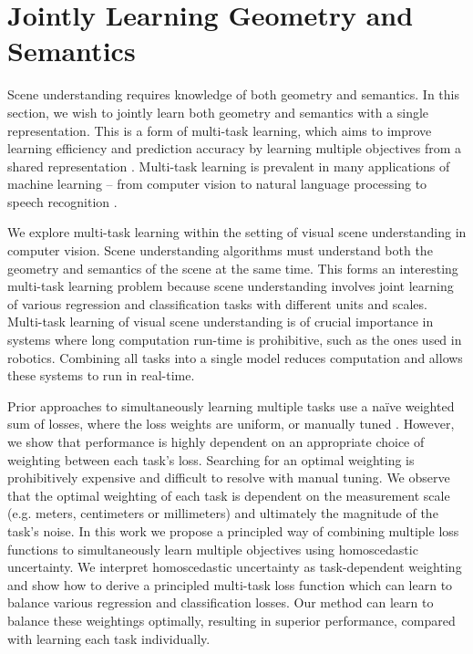\section{Jointly Learning Geometry and Semantics}
\label{sec:mlttask}

Scene understanding requires knowledge of both geometry and semantics. In this section, we wish to jointly learn both geometry and semantics with a single representation.
This is a form of multi-task learning, which aims to improve learning efficiency and prediction accuracy by learning multiple objectives from a shared representation \citep{caruana1998multitask}. Multi-task learning is prevalent in many applications of machine learning -- from computer vision \citep{kokkinos2016ubernet} to natural language processing \citep{collobert2008unified} to speech recognition \citep{huang2013cross}.

We explore multi-task learning within the setting of visual scene understanding in computer vision. Scene understanding algorithms must understand both the geometry and semantics of the scene at the same time. This forms an interesting multi-task learning problem because scene understanding involves joint learning of various regression and classification tasks with different units and scales. Multi-task learning of visual scene understanding is of crucial importance in systems where long computation run-time is prohibitive, such as the ones used in robotics. Combining all tasks into a single model reduces computation and allows these systems to run in real-time.

Prior approaches to simultaneously learning multiple tasks use a na{\"i}ve weighted sum of losses, where the loss weights are uniform, or manually tuned \citep{sermanet2013overfeat,kokkinos2016ubernet,eigen2015predicting}. However, we show that performance is highly dependent on an appropriate choice of weighting between each task's loss. Searching for an optimal weighting is prohibitively expensive and difficult to resolve with manual tuning. We observe that the optimal weighting of each task is dependent on the measurement scale (e.g. meters, centimeters or millimeters) and ultimately the magnitude of the task's noise. In this work we propose a principled way of combining multiple loss functions to simultaneously learn multiple objectives using homoscedastic uncertainty. We interpret homoscedastic uncertainty as task-dependent weighting and show how to derive a principled multi-task loss function which can learn to balance various regression and classification losses. Our method can learn to balance these weightings optimally, resulting in superior performance, compared with learning each task individually. 

